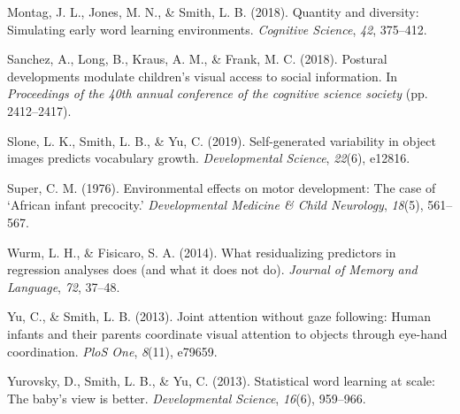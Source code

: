 \documentclass[10pt, letterpaper]{article}
\newenvironment{CSLReferences}%
  {}%
  {\par}
\begin{document}
\begin{CSLReferences}{1}{0}
\leavevmode\hypertarget{ref-montag2018quantity}{}%
Montag, J. L., Jones, M. N., \& Smith, L. B. (2018). Quantity and
diversity: Simulating early word learning environments. \emph{Cognitive
Science}, \emph{42}, 375--412.

\leavevmode\hypertarget{ref-sanchez2018detecting}{}%
Sanchez, A., Long, B., Kraus, A. M., \& Frank, M. C. (2018). Postural
developments modulate children's visual access to social information. In
\emph{Proceedings of the 40th annual conference of the cognitive science
society} (pp. 2412--2417).

\leavevmode\hypertarget{ref-slone2019self}{}%
Slone, L. K., Smith, L. B., \& Yu, C. (2019). Self-generated variability
in object images predicts vocabulary growth. \emph{Developmental
Science}, \emph{22}(6), e12816.

\leavevmode\hypertarget{ref-super1976environmental}{}%
Super, C. M. (1976). Environmental effects on motor development: The
case of {`{A}frican infant precocity.'} \emph{Developmental Medicine \&
Child Neurology}, \emph{18}(5), 561--567.

\leavevmode\hypertarget{ref-wurm2014residualizing}{}%
Wurm, L. H., \& Fisicaro, S. A. (2014). What residualizing predictors in
regression analyses does (and what it does not do). \emph{Journal of
Memory and Language}, \emph{72}, 37--48.

\leavevmode\hypertarget{ref-yu2013joint}{}%
Yu, C., \& Smith, L. B. (2013). Joint attention without gaze following:
Human infants and their parents coordinate visual attention to objects
through eye-hand coordination. \emph{PloS One}, \emph{8}(11), e79659.

\leavevmode\hypertarget{ref-yurovsky2013statistical}{}%
Yurovsky, D., Smith, L. B., \& Yu, C. (2013). Statistical word learning
at scale: The baby's view is better. \emph{Developmental Science},
\emph{16}(6), 959--966.

\end{CSLReferences}


\end{document}
